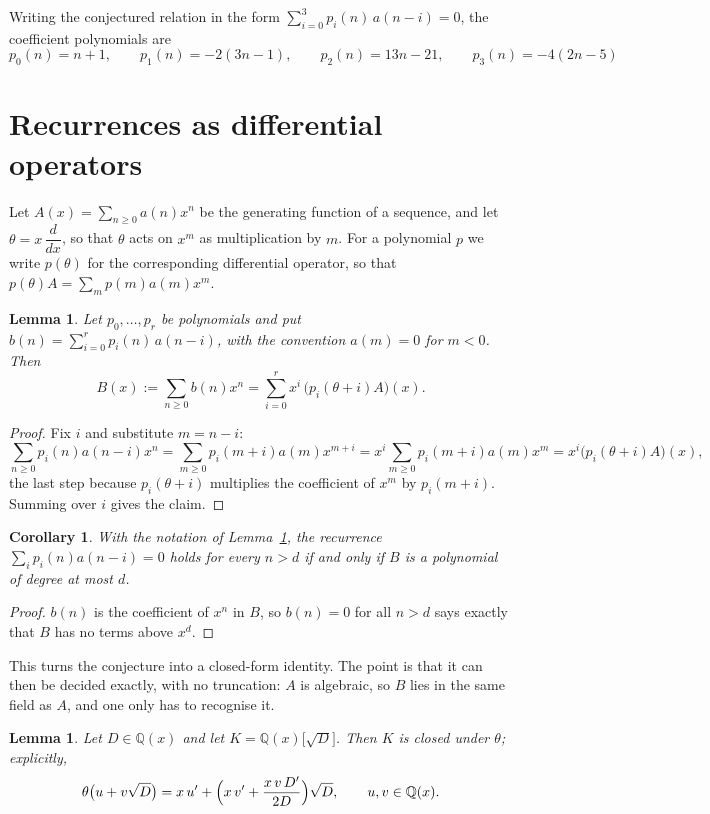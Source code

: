 \documentclass[11pt,a4paper]{article}
\theoremstyle{plain}
\newtheorem{lemma}[theorem]{Lemma}
\newtheorem{corollary}[theorem]{Corollary}
\theoremstyle{definition}
\begin{document}
Writing the conjectured relation in the form $\sum_{i=0}^{3}p_{i}(n)\,a(n-i)=0$,
the coefficient polynomials are
\[
p_{0}(n)=n + 1,\qquad p_{1}(n)=- 2 \left(3 n - 1\right),\qquad p_{2}(n)=13 n - 21,\qquad p_{3}(n)=- 4 \left(2 n - 5\right)
\]

\section{Recurrences as differential operators}

Let $A(x)=\sum_{n\ge0}a(n)x^{n}$ be the generating function of a sequence, and let
$\theta=x\,\dfrac{d}{dx}$, so that $\theta$ acts on $x^{m}$ as multiplication by $m$. For a
polynomial $p$ we write $p(\theta)$ for the corresponding differential operator, so that
$p(\theta)A=\sum_{m}p(m)a(m)x^{m}$.

\begin{lemma}\label{lem:transfer}
Let $p_{0},\dots,p_{r}$ be polynomials and put $b(n)=\sum_{i=0}^{r}p_{i}(n)\,a(n-i)$, with
the convention $a(m)=0$ for $m<0$. Then
\[
B(x):=\sum_{n\ge0}b(n)x^{n}=\sum_{i=0}^{r}x^{i}\,\bigl(p_{i}(\theta+i)A\bigr)(x).
\]
\end{lemma}

\begin{proof}
Fix $i$ and substitute $m=n-i$:
\[
\sum_{n\ge0}p_{i}(n)a(n-i)x^{n}=\sum_{m\ge0}p_{i}(m+i)a(m)x^{m+i}
=x^{i}\sum_{m\ge0}p_{i}(m+i)a(m)x^{m}=x^{i}\bigl(p_{i}(\theta+i)A\bigr)(x),
\]
the last step because $p_{i}(\theta+i)$ multiplies the coefficient of $x^{m}$ by
$p_{i}(m+i)$. Summing over $i$ gives the claim.
\end{proof}

\begin{corollary}\label{cor:criterion}
With the notation of Lemma~\ref{lem:transfer}, the recurrence
$\sum_{i}p_{i}(n)a(n-i)=0$ holds for every $n>d$ if and only if $B$ is a polynomial of
degree at most $d$.
\end{corollary}

\begin{proof}
$b(n)$ is the coefficient of $x^{n}$ in $B$, so $b(n)=0$ for all $n>d$ says exactly that
$B$ has no terms above $x^{d}$.
\end{proof}

This turns the conjecture into a closed-form identity. The point is that it can then be
decided exactly, with no truncation: $A$ is algebraic, so $B$ lies in the same field as
$A$, and one only has to recognise it.

\begin{lemma}\label{lem:field}
Let $D\in\mathbb{Q}(x)$ and let $K=\mathbb{Q}(x)\bigl[\sqrt{D}\bigr]$. Then $K$ is closed
under $\theta$; explicitly,
\[
\theta\bigl(u+v\sqrt{D}\bigr)=x\,u'+\Bigl(x\,v'+\frac{x\,v\,D'}{2D}\Bigr)\sqrt{D},
\qquad u,v\in\mathbb{Q}(x).
\]
\end{lemma}
\end{document}
